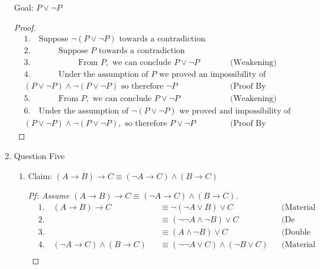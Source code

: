 \documentclass{article}
\begin{document}
\begin{enumerate}
    Goal: $P \lor \neg P$
    \begin{proof}
        \begin{align*}
            &1. \quad \text{Suppose } \neg (P \lor \neg P) \text{ towards a contradiction} \\
            &2. \quad \hspace{1cm} \text{Suppose } P \text{ towards a contradiction} \\
            &3. \quad \hspace{2cm} \text{From } P, \text{ we can conclude } P \lor \neg P && \text{(Weakening)} \\
            &4. \quad \hspace{1cm} \text{Under the assumption of } P \text{ we proved an impossibility of } \\
            &(P \lor \neg P) \land \neg (P \lor \neg P) \text{ so therefore } \neg P && \text{(Proof By Contradiction)} \\
            &5. \quad \hspace{1cm} \text{From } P, \text{ we can conclude } P \lor \neg P && \text{(Weakening)} \\
            &6. \quad \text{Under the assumption of } \neg (P \lor \neg P) \text{ we proved and impossibility of } \\
            &(P \lor \neg P) \land \neg (P \lor \neg P), \text{ so therefore } P \lor \neg P && \text{(Proof By Contradiction)}
        \end{align*}
    \end{proof}
    \item Question Five
    \begin{enumerate}
        \item
        Claim: $(A \rightarrow B) \rightarrow C \equiv (\neg A \rightarrow C) \land (B \rightarrow C)$
        \begin{proof}[Pf: Assume $(A \rightarrow B) \rightarrow C \equiv (\neg A \rightarrow C) \land (B \rightarrow C)$]
            \begin{align*}
                &1. \quad (A \rightarrow B) \rightarrow C && \equiv \neg (\neg A \lor B) \lor C && \text{(Material Implication)}\\
                &2. \quad && \equiv (\neg \neg A \land \neg B) \lor C && \text{(De Morgan's)} \\
                &3. \quad && \equiv (A \land \neg B) \lor C && \text{(Double Negation)} \\
                &4. \quad (\neg A \rightarrow C) \land (B \rightarrow C) && \equiv (\neg \neg A \lor C) \land (\neg B \lor C) && \text{(Material Implication)} \\

\end{align*}
\end{proof}
\end{enumerate}
\end{enumerate}
\end{document}
